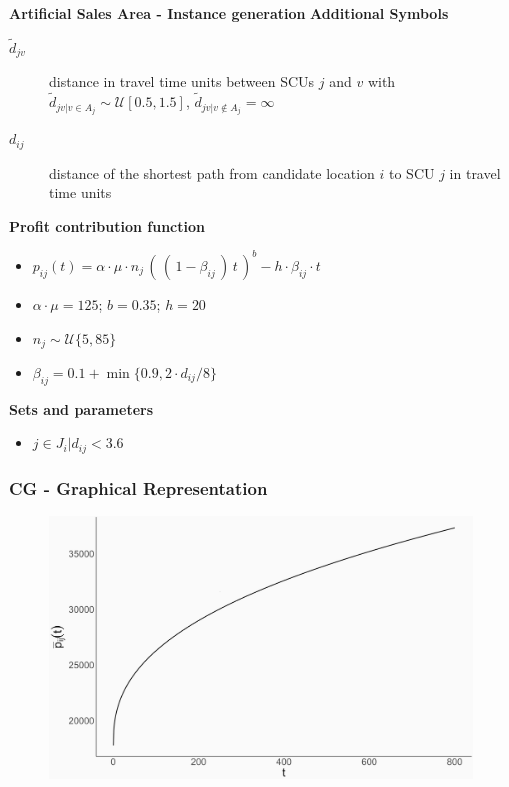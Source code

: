 \documentclass[xcolor=dvipsnames,aspectratio=169, handout, mathserif]{beamer}
\begin{document}
\begin{frame}{\textbf{Artificial Sales Area - Instance generation}}
\vspace{-2mm}
\textbf{Additional Symbols}
\vspace{-1.5mm}
\begin{description}
  \item[$\tilde{d}_{jv}$] distance in travel time units between SCUs $j$ and $v$ with $\tilde{d}_{jv|v \in A_j} \sim \mathcal{U}[0.5,1.5]$, $\tilde{d}_{jv|v \notin A_j}=\infty$
  \item[$d_{ij}$] distance of the shortest path from candidate location $i$ to SCU $j$ in travel time units
\end{description}
\vspace{-1.5mm}
\textbf{Profit contribution function}
\vspace{-1.5mm}
\begin{itemize}
\item $p_{ij}(t) = \alpha \cdot \mu \cdot n_j \, (\, (\, 1- \beta_{ij} \,)\, t\, ) ^ b - h \cdot \beta_{ij} \cdot t$
\item $\alpha \cdot \mu = 125$; $b=0.35$; $h=20$
\item $n_j \sim \mathcal{U}\{5,85\}$
\item $\beta_{ij}=0.1+ \min \{0.9,2 \cdot d_{ij}/8\} $
\end{itemize}

\vspace{-1.5mm}
\textbf{Sets and parameters}
\vspace{-1.5mm}
\begin{itemize}
    \item $j \in J_i|d_{ij} < 3.6$ 
\end{itemize}

\end{frame}

\begin{frame}
\frametitle{CG - Graphical Representation}
\begin{center}
\begin{figure}
    \centering
    \includegraphics[width=0.8\linewidth]{p1.png}
\end{figure}
\end{center}
\end{frame}
\end{document}
